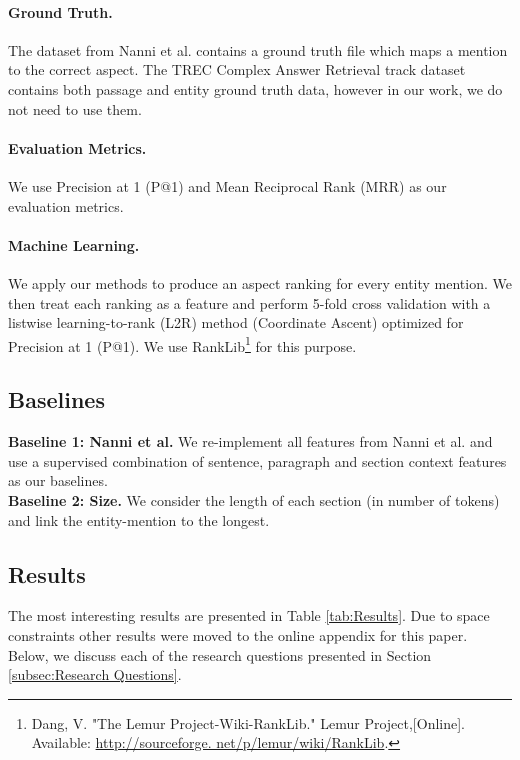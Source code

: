 \paragraph{\textbf{Ground Truth.}} The dataset from Nanni et al. \cite{nanni2018entity} contains a ground truth file which maps a mention to the correct aspect. The TREC Complex Answer Retrieval track \cite{dietz2018trec} dataset contains both passage and entity ground truth data, however in our work, we do not need to use them. 

\paragraph{\textbf{Evaluation Metrics.}} We use Precision at 1 (P@1) and Mean Reciprocal Rank (MRR) as our evaluation metrics.

\paragraph{\textbf{Machine Learning.}}
We apply our methods to produce an aspect ranking for every entity mention. We then treat each ranking as a feature and perform 5-fold cross validation with a listwise learning-to-rank (L2R) method (Coordinate Ascent) optimized for Precision at 1 (P@1). We use RankLib\footnote{Dang, V. "The Lemur Project-Wiki-RankLib." Lemur Project,[Online]. Available: \url{http://sourceforge. net/p/lemur/wiki/RankLib}.} for this purpose. 


\subsection{Baselines}
\label{subsec:Baselines}

\textbf{Baseline 1: Nanni et al.} We re-implement all features from Nanni et al. \cite{nanni2018entity} and use a supervised combination of sentence, paragraph and section context features as our baselines. \\
\textbf{Baseline 2: Size.} We consider the length of each section (in number of tokens) and link the entity-mention to the longest. \\

\subsection{Results}
\label{subsec:Results}
The most interesting results are presented in Table \ref{tab:Results}. Due to space constraints other results were moved to the online appendix for this paper. Below, we discuss each of the research questions presented in Section \ref{subsec:Research Questions}.


